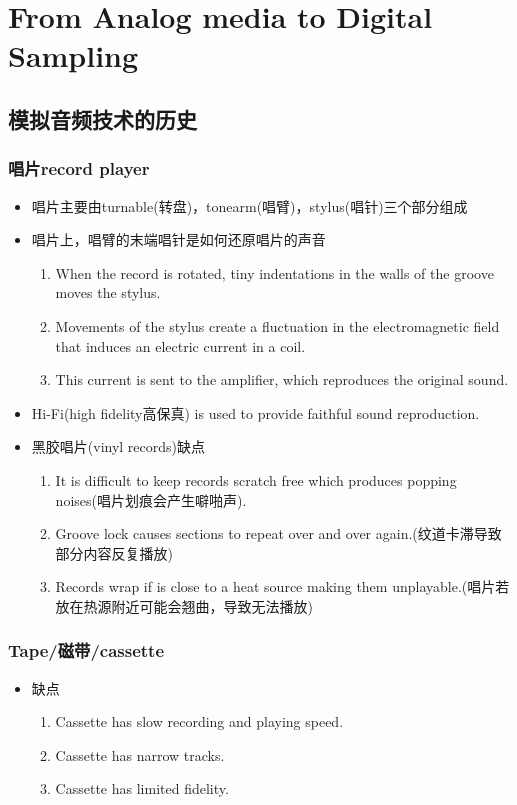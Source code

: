 \documentclass[UTF8]{ctexart}
\begin{document}
\section{From Analog media to Digital Sampling}

\subsection{模拟音频技术的历史}
\subsubsection{唱片record player}
\begin{itemize}
    \item 唱片主要由turnable(转盘)，tonearm(唱臂)，stylus(唱针)三个部分组成
    \item 唱片上，唱臂的末端唱针是如何还原唱片的声音
    \begin{enumerate}
        \item When the record is rotated, tiny indentations in the walls of the groove moves the stylus.
        \item Movements of the stylus create a fluctuation in the electromagnetic field that induces an electric current in a coil.
        \item This current is sent to the amplifier, which reproduces the original sound.
    \end{enumerate}
    \item Hi-Fi(high fidelity高保真) is used to provide faithful sound reproduction.
    \item 黑胶唱片(vinyl records)缺点
    \begin{enumerate}
        \item It is difficult to keep records scratch free which produces popping noises(唱片划痕会产生噼啪声).
        \item Groove lock causes sections to repeat over and over again.(纹道卡滞导致部分内容反复播放)
        \item Records wrap if is close to a heat source making them unplayable.(唱片若放在热源附近可能会翘曲，导致无法播放)
    \end{enumerate}
\end{itemize}
\subsubsection{Tape/磁带/cassette}
\begin{itemize}
    \item 缺点
    \begin{enumerate}
        \item Cassette has slow recording and playing speed.
        \item Cassette has narrow tracks. 
        \item Cassette has limited fidelity.
    \end{enumerate}
\end{itemize}
\end{document}
